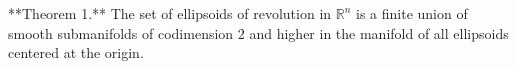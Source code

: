 **Theorem 1.** The set of ellipsoids of revolution in $\mathbb{R}^n$ is a finite union of smooth submanifolds of codimension $2$ and higher in the manifold of all ellipsoids centered at the origin.
